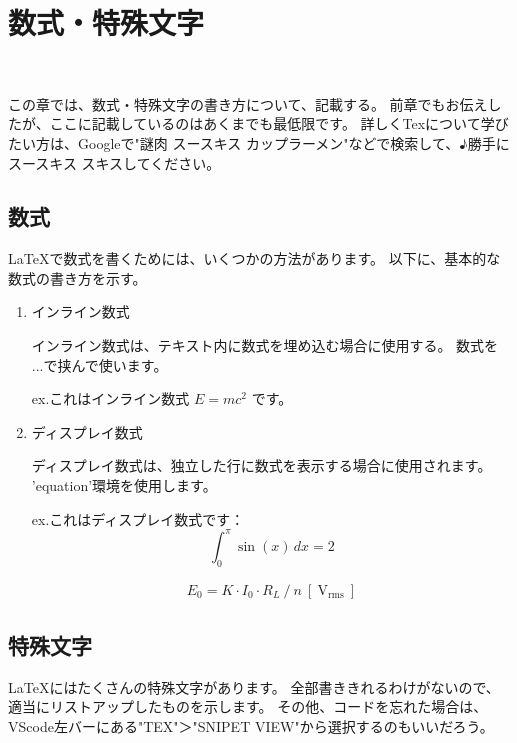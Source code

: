 \chapter{数式・特殊文字}
\vspace{20mm}\hrulefill\\\vspace{20mm}

この章では、数式・特殊文字の書き方について、記載する。
前章でもお伝えしたが、ここに記載しているのはあくまでも最低限です。
詳しくTexについて学びたい方は、Googleで"謎肉 スースキス カップラーメン"などで検索して、♪勝手に スースキス スキスしてください。

\newpage

\section{数式}
\LaTeX で数式を書くためには、いくつかの方法があります。
以下に、基本的な数式の書き方を示す。
\begin{enumerate}
	\item インライン数式
	
		インライン数式は、テキスト内に数式を埋め込む場合に使用する。
		数式を $ ... $で挟んで使います。
		
		ex.これはインライン数式 $E=mc^2$ です。

	\item ディスプレイ数式
	
		ディスプレイ数式は、独立した行に数式を表示する場合に使用されます。
		'equation'環境を使用します。
		
		ex.これはディスプレイ数式です：
		\begin{equation}
			\int_{0}^{\pi} \sin(x) \, dx = 2
		\end{equation}

		\begin{eqnarray}
			E_0 = {K}\cdot{I_0}\cdot{R_L}\ /\ {n}\  [\ \mathrm{V_{rms}}\ ]
		\end{eqnarray}

\end{enumerate}

\section{特殊文字}
\LaTeX にはたくさんの特殊文字があります。
全部書ききれるわけがないので、適当にリストアップしたものを示します。
その他、コードを忘れた場合は、VScode左バーにある"TEX"＞"SNIPET VIEW"から選択するのもいいだろう。

